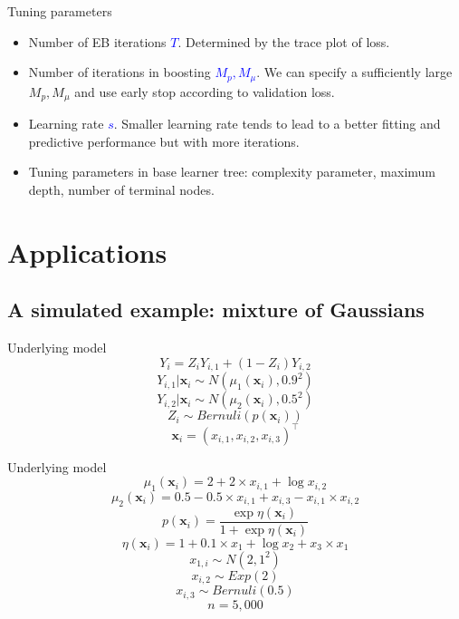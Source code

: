 \documentclass[professionalfont]{beamer}
\def\bx{\boldsymbol{x}}
\newcommand{\blue}[1]{\textcolor{blue}{#1}}
\begin{document}
\begin{frame}{Tuning parameters}
	\begin{itemize}
		\item Number of EB iterations \blue{$T$}. Determined by the trace plot of loss.
		\item Number of iterations in boosting \blue{$M_p,M_\mu$}. We can specify a sufficiently large $M_p,M_\mu$ and use  early stop according to validation loss.
			\item Learning rate \blue{$s$}. Smaller learning rate tends to lead to a better fitting and predictive performance but with more iterations.
			\item Tuning parameters in base learner tree: complexity parameter, maximum depth, number of terminal nodes.
	\end{itemize}
\end{frame}
\section{Applications}
\subsection{A simulated example: mixture of Gaussians}
\begin{frame}{Underlying model}
$$Y_i =Z_iY_{i,1}+(1-Z_i)Y_{i,2}$$
$$Y_{i,1}|\bx_i \sim N(\mu_1(\bx_i), 0.9^2)$$
$$Y_{i,2}|\bx_i \sim N(\mu_2(\bx_i), 0.5^2)$$
$$Z_i \sim Bernuli(p(\bx_i))$$
$$\bx_i=(x_{i,1},x_{i,2},x_{i,3})^{\top}$$
\end{frame}

\begin{frame}{Underlying model}
	$$\mu_1(\bx_i)=2+2\times x_{i,1} + \log x_{i,2}$$
	$$\mu_2(\bx_i) = 0.5-0.5\times x_{i,1}+x_{i,3}-x_{i,1}\times x_{i,2}$$
	$$p(\bx_i)=\frac{\exp\eta(\bx_i)}{1+\exp\eta(\bx_i)}$$
	$$\eta(\bx_i)=1+0.1\times x_1+\log x_2 +x_3\times x_1$$
	$$x_{1,i}\sim N(2,1^2)$$
	$$x_{i,2}\sim Exp(2)$$
	$$x_{i,3}\sim Bernuli(0.5)$$
	$$n=5,000$$
\end{frame}
\end{document}
